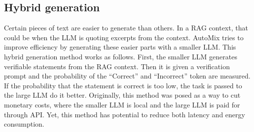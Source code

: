 \subsection{Hybrid generation}
Certain pieces of text are easier to generate than others. In a RAG context, that could be when the LLM is quoting excerpts from the context. AutoMix tries to improve efficiency by generating these easier parts with a smaller LLM. This hybrid generation method works as follows. First, the smaller LLM generates verifiable statements from the RAG context. Then it is given a verification prompt and the probability of the ``Correct'' and ``Incorrect'' token are measured. If the probability that the statement is correct is too low, the task is passed to the large LLM do it better. Originally, this method was posed as a way to cut monetary costs, where the smaller LLM is local and the large LLM is paid for through API. Yet, this method has potential to reduce both latency and energy consumption.

